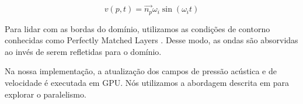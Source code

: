 \begin{equation}
	v(p, t) = \vec{n_p}\omega_i\sin(\omega_it) 
\end{equation}

Para lidar com as bordas do domínio, utilizamos as condições de contorno conhecidas como Perfectly Matched Layers \cite{liu1997perfectly}. Desse modo, as ondas são absorvidas ao invés de serem refletidas para o domínio.

Na nossa implementação, a atualização dos campos de pressão acústica e de velocidade é executada em GPU. Nós utilizamos a abordagem descrita em \cite{micikevicius20093d} para explorar o paralelismo.


